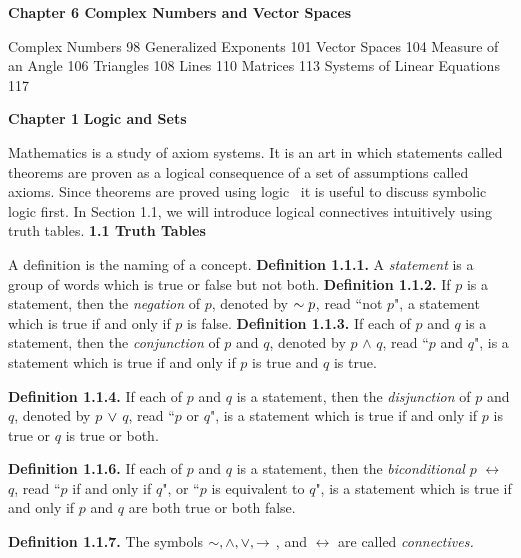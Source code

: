 \begin{large}
\textbf{Chapter 6 Complex Numbers and Vector Spaces} \nl

 Complex Numbers \hfill 98 Generalized Exponents \hfill 101 Vector Spaces \hfill 104 Measure of an Angle \hfill 106 Triangles \hfill 108 Lines \hfill 110 Matrices \hfill 113   Systems of Linear Equations \hfill 117\nl

\newpage
\setcounter{page}{1}
\textbf{Chapter 1}\nl
{}
\fl \textbf{Logic and Sets} \nl

Mathematics is a study of axiom systems. It is an art in which statements called theorems are proven as a logical consequence of a set of assumptions called axioms. Since theorems are proved using logic~ it is useful to discuss symbolic logic first. In Section 1.1, we will introduce logical connectives intuitively using truth tables. \nl
\fl \textbf{1.1 Truth Tables}\nl

A definition is the naming of a concept.
\fl \textbf{Definition 1.1.1.} A \textit{statement} is a group of words which is true or false but not both. \nl
\fl \textbf{Definition 1.1.2.} If $p$ is a statement, then the \textit{negation} of $p$, denoted by $\sim p$, read ``not $p$", a statement which is true if and only if $p$ is false. \nl
\fl \textbf{Definition 1.1.3.} If each of $p$ and $q$ is a statement, then the \textit{conjunction} of $p$ and $q$, denoted by $p$ $\wedge$ $q$, read ``$p$ and $q$", is a statement which is true if and only if $p$ is true and $q$ is true.\nl

\fl \textbf{Definition 1.1.4.} If each of $p$ and $q$ is a statement, then the \textit{disjunction} of $p$ and $q$, denoted by $p$ $\lor$ $q$, read ``$p$ or $q$", is a statement which is true if and only if $p$ is true or $q$ is true or both. \nl


\fl \textbf{Definition 1.1.6.} If each of $p$ and $q$ is a statement, then the \textit{biconditional} $p$ $\leftrightarrow$ $q$, read ``$p$ if and only if $q$", or ``$p$ is equivalent to $q$", is a statement which is true if and only if $p$ and $q$ are both true or both false. \nl

\fl \textbf{Definition 1.1.7.} The symbols $\sim ,\wedge, \lor, \to$ , and $\leftrightarrow$ are called \textit{connectives.} \nl


\end{large}
